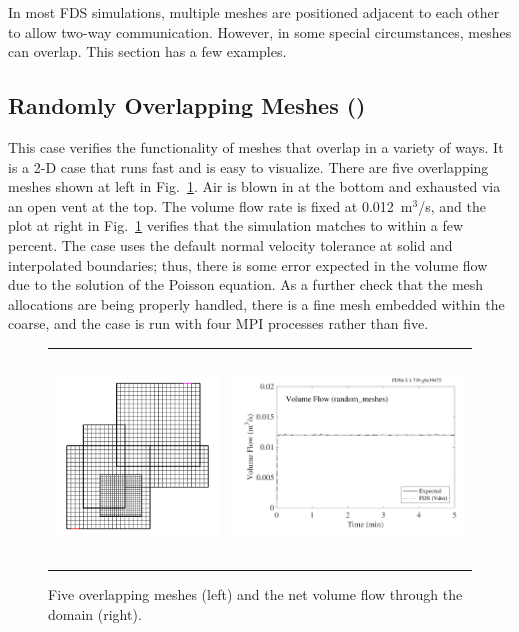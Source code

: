 \documentclass[11pt]{book}
\begin{document}
In most FDS simulations, multiple meshes are positioned adjacent to each other to allow two-way communication. However, in some special circumstances, meshes can overlap. This section has a few examples.

\subsection{Randomly Overlapping Meshes (\texorpdfstring{}{random\_meshes})}
\label{random_meshes}

This case verifies the functionality of meshes that overlap in a variety of ways. It is a 2-D case that runs fast and is easy to visualize. There are five overlapping meshes shown at left in Fig.~\ref{random_meshes_fig}. Air is blown in at the bottom and exhausted via an open vent at the top. The volume flow rate is fixed at 0.012~m$^3$/s, and the plot at right in Fig.~\ref{random_meshes_fig} verifies that the simulation matches to within a few percent. The case uses the default normal velocity tolerance at solid and interpolated boundaries; thus, there is some error expected in the volume flow due to the solution of the Poisson equation. As a further check that the mesh allocations are being properly handled, there is a fine mesh embedded within the coarse, and the case is run with four MPI processes rather than five.

\begin{figure}[!ht]
\begin{tabular*}{\textwidth}{lr}
\includegraphics[height=2.2in]{SCRIPT_FIGURES/random_meshes.png} &
\includegraphics[height=2.2in]{SCRIPT_FIGURES/random_meshes.pdf}
\end{tabular*}
\caption[The  test case]{Five overlapping meshes (left) and the net volume flow through the domain (right).}
\label{random_meshes_fig}
\end{figure}
\end{document}
